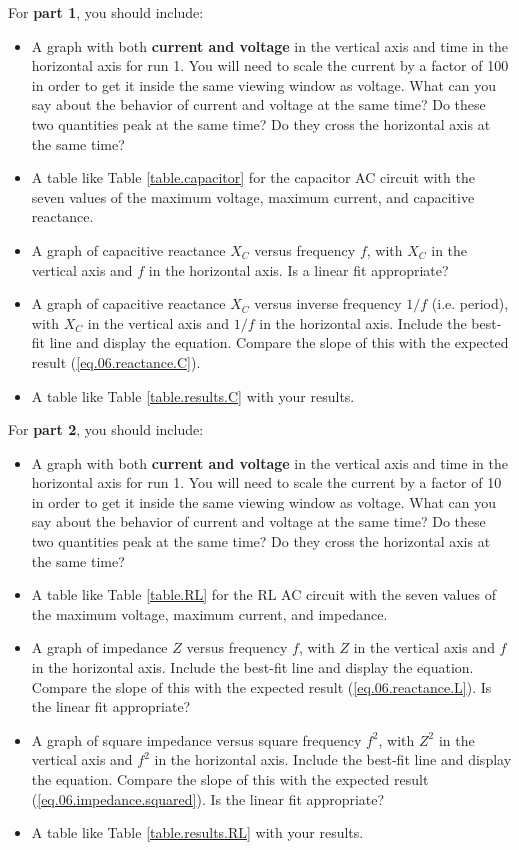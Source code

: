 For \textbf{part 1}, you should include:
\begin{itemize}
	\item A graph with both \textbf{current and voltage} in the vertical axis and time in the horizontal axis for run 1. You will need to scale the current by a factor of 100 in order to get it inside the same viewing window as voltage. What can you say about the behavior of current and voltage at the same time? Do these two quantities peak at the same time? Do they cross the horizontal axis at the same time?
	\item A table like Table \ref{table.capacitor} for the capacitor AC circuit with the seven values of the maximum voltage, maximum current, and capacitive reactance.
	\item A graph of capacitive reactance $X_{C}$ versus frequency $f$, with $X_{C}$ in the vertical axis and $f$ in the horizontal axis. Is a linear fit appropriate?
	\item A graph of capacitive reactance $X_{C}$ versus inverse frequency $1/f$ (i.e. period), with $X_{C}$ in the vertical axis and $1/f$ in the horizontal axis. Include the best-fit line and display the equation. Compare the slope of this with the expected result (\ref{eq.06.reactance.C}).
	\item A table like Table \ref{table.results.C} with your results.
\end{itemize}
For \textbf{part 2}, you should include:
\begin{itemize}
	\item A graph with both \textbf{current and voltage} in the vertical axis and time in the horizontal axis for run 1. You will need to scale the current by a factor of 10 in order to get it inside the same viewing window as voltage. What can you say about the behavior of current and voltage at the same time? Do these two quantities peak at the same time? Do they cross the horizontal axis at the same time?
	\item A table like Table \ref{table.RL} for the RL AC circuit with the seven values of the maximum voltage, maximum current, and impedance.
	\item A graph of impedance $Z$ versus frequency $f$, with $Z$ in the vertical axis and $f$ in the horizontal axis. Include the best-fit line and display the equation. Compare the slope of this with the expected result (\ref{eq.06.reactance.L}). Is the linear fit appropriate?
	\item A graph of square impedance versus square frequency $f^{2}$, with $Z^{2}$ in the vertical axis and $f^{2}$ in the horizontal axis. Include the best-fit line and display the equation. Compare the slope of this with the expected result (\ref{eq.06.impedance.squared}). Is the linear fit appropriate?
	\item A table like Table \ref{table.results.RL} with your results.
\end{itemize}
